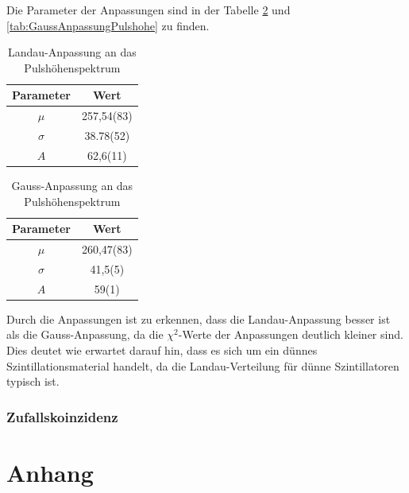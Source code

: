 \documentclass{article}
\begin{document}
Die Parameter der Anpassungen sind in der Tabelle \ref{tab:LandauAnpassungPulshohe} und \ref{tab:GaussAnpassungPulshohe} zu finden.
\begin{table}[H]
    \centering
    \caption{Landau-Anpassung an das Pulshöhenspektrum}
    \begin{tabular}{|c|c|}
        \hline
        Parameter & Wert \\ \hline
        $\mu$ & 257,54(83) \\ \hline
        $\sigma$ & 38.78(52) \\ \hline
        $A$ & 62,6(11) \\ \hline
    \end{tabular}
    \label{tab:LandauAnpassungPulshohe}
\end{table}
\begin{table}[H]
    \centering
    \caption{Gauss-Anpassung an das Pulshöhenspektrum}
    \begin{tabular}{|c|c|}
        \hline
        Parameter & Wert \\ \hline
        $\mu$ & 260,47(83) \\ \hline
        $\sigma$ & 41,5(5) \\ \hline
        $A$ & 59(1) \\ \hline
    \end{tabular}
    \label{tab:LandauAnpassungPulshohe}
\end{table}

Durch die Anpassungen ist zu erkennen, dass die Landau-Anpassung besser ist als die Gauss-Anpassung, da die $\chi^2$-Werte der Anpassungen deutlich kleiner sind.
Dies deutet wie erwartet darauf hin, dass es sich um ein dünnes Szintillationsmaterial handelt, da die Landau-Verteilung für dünne Szintillatoren typisch ist.


\subsubsection*{Zufallskoinzidenz}


\section{Anhang}
\end{document}
